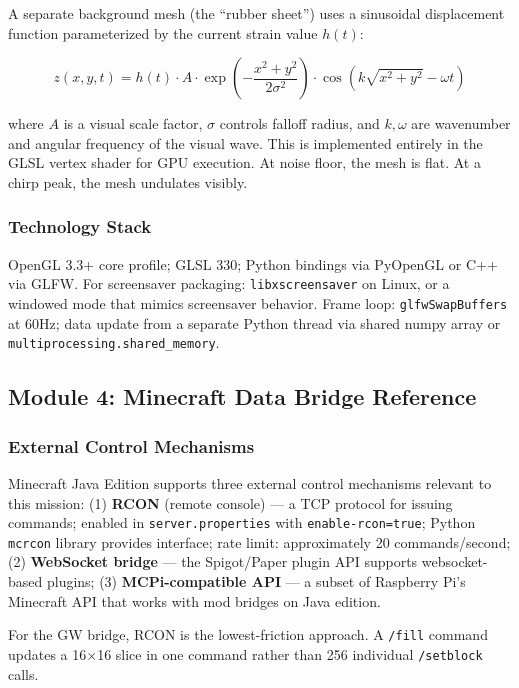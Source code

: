 \documentclass[11pt,letterpaper]{article}
\begin{document}
A separate background mesh (the ``rubber sheet'') uses a sinusoidal displacement function parameterized by the current strain value $h(t)$:

\[
  z(x, y, t) = h(t) \cdot A \cdot \exp\!\left(-\frac{x^2 + y^2}{2\sigma^2}\right) \cdot \cos(k\sqrt{x^2+y^2} - \omega t)
\]

where $A$ is a visual scale factor, $\sigma$ controls falloff radius, and $k, \omega$ are wavenumber and angular frequency of the visual wave. This is implemented entirely in the GLSL vertex shader for GPU execution. At noise floor, the mesh is flat. At a chirp peak, the mesh undulates visibly.

\subsubsection{Technology Stack}

OpenGL 3.3+ core profile; GLSL 330; Python bindings via PyOpenGL or C++ via GLFW. For screensaver packaging: \texttt{libxscreensaver} on Linux, or a windowed mode that mimics screensaver behavior. Frame loop: \texttt{glfwSwapBuffers} at 60Hz; data update from a separate Python thread via shared numpy array or \texttt{multiprocessing.shared\_memory}.

\subsection{Module 4: Minecraft Data Bridge Reference}

\subsubsection{External Control Mechanisms}

Minecraft Java Edition supports three external control mechanisms relevant to this mission: (1) \textbf{RCON} (remote console) --- a TCP protocol for issuing commands; enabled in \texttt{server.properties} with \texttt{enable-rcon=true}; Python \texttt{mcrcon} library provides interface; rate limit: approximately 20 commands/second; (2) \textbf{WebSocket bridge} --- the Spigot/Paper plugin API supports websocket-based plugins; (3) \textbf{MCPi-compatible API} --- a subset of Raspberry Pi's Minecraft API that works with mod bridges on Java edition.

For the GW bridge, RCON is the lowest-friction approach. A \texttt{/fill} command updates a 16$\times$16 slice in one command rather than 256 individual \texttt{/setblock} calls.
\end{document}
